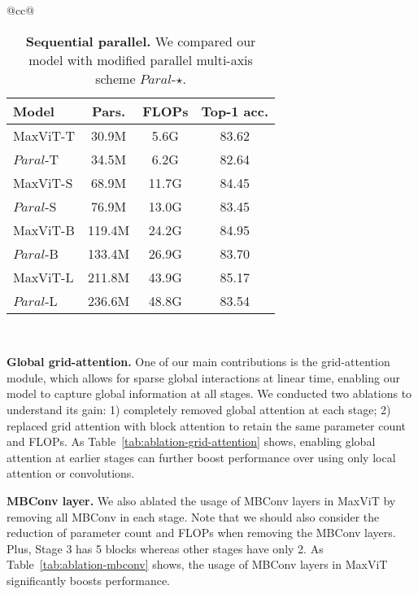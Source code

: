 \documentclass[runningheads]{llncs}
\begin{document}
\begin{table*}[!t]
\begin{tabular}{@{}cc@{}}
\begin{minipage}[t]{0.48\textwidth}
\centering
\setlength{\tabcolsep}{2.5pt}
\renewcommand{\arraystretch}{0.9}
\caption{\textbf{Sequential \vs parallel.} We compared our model with modified parallel multi-axis scheme $Paral$-$\star$.}
\label{tab:ablation-parallel}
\begin{tabular}{l|ccc}
Model & Pars. & FLOPs & Top-1 acc. \\
\toprule
MaxViT-T & 30.9M & 5.6G & 83.62 \\
$Paral$-T & 34.5M & 6.2G & 82.64\scriptsize\color{gray}{(-0.98)} \\ \hline
MaxViT-S & 68.9M & 11.7G & 84.45 \\ 
$Paral$-S & 76.9M & 13.0G & 83.45\scriptsize\color{gray}{(-1.00)} \\ \hline
MaxViT-B & 119.4M & 24.2G & 84.95  \\
$Paral$-B & 133.4M & 26.9G & 83.70\scriptsize\color{gray}{(-1.25)}\\ \hline
MaxViT-L & 211.8M & 43.9G & 85.17 \\
$Paral$-L & 236.6M & 48.8G & 83.54\scriptsize\color{gray}{(-1.63)} \\ 
\end{tabular}
\end{minipage}\\
\end{tabular}
\end{table*}

\noindent\textbf{Global grid-attention.} One of our main contributions is the grid-attention module, which allows for sparse global interactions at linear time, enabling our model to capture global information at all stages. We conducted two ablations to understand its gain: 1) completely removed global attention at each stage; 2) replaced grid attention with block attention to retain the same parameter count and FLOPs. As Table~\ref{tab:ablation-grid-attention} shows, enabling global attention at earlier stages can further boost performance over using only local attention or convolutions. 

\noindent\textbf{MBConv layer.} We also ablated the usage of MBConv layers in MaxViT by removing all MBConv in each stage. Note that we should also consider the reduction of parameter count and FLOPs when removing the MBConv layers. Plus, Stage 3 has 5 blocks whereas other stages have only 2. As Table~\ref{tab:ablation-mbconv} shows, the usage of MBConv layers in MaxViT significantly boosts performance.
\end{document}
